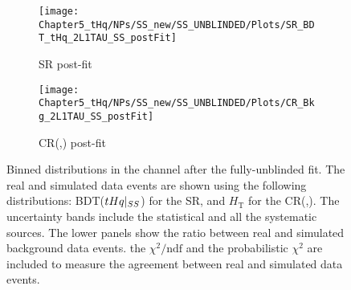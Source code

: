 \begin{figure}[ht]
    \begin{subfigure}[b]{0.42\textwidth}
        \centering
        \texttt{[image: Chapter5\_tHq/NPs/SS\_new/SS\_UNBLINDED/Plots/SR\_BDT\_tHq\_2L1TAU\_SS\_postFit]}
        \caption{SR post-fit}
        \label{fig:ChaptH:fitToData:SS:prepostfit:postfit:SR}
    \end{subfigure}
    \hfill
    \begin{subfigure}[b]{0.42\textwidth}
        \centering
        \texttt{[image: Chapter5\_tHq/NPs/SS\_new/SS\_UNBLINDED/Plots/CR\_Bkg\_2L1TAU\_SS\_postFit]}
        \caption{CR(\ttbar,\ttX) post-fit}
        \label{fig:ChaptH:fitToData:SS:prepostfit:postfit:CRtt}
    \end{subfigure}
    \caption{Binned distributions in the \dilepSStau channel after the fully-unblinded fit.
    The real and simulated data events are shown using the following distributions: BDT($tHq|_{SS}$) for the SR, 
    and $H_{\text{T}}$ for the CR(\ttbar,\ttX). The uncertainty bands include the statistical and 
    all the systematic sources. The lower panels show the ratio between real and simulated background data events.
    the $\chi^{2}/\text{ndf}$ and the probabilistic $\chi^{2}$ are included to measure the agreement between 
    real and simulated data events.}
    \label{fig:ChaptH:fitToData:SS:prepostfit}
\end{figure}














\begin{comment}
aaaaasdf
%
\end{comment}
